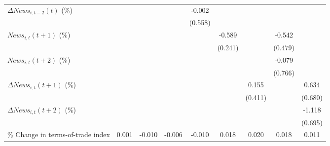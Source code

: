{\begin{tabular}{l*{8}{c}}
\addlinespace
$ \Delta News_{i,t-2}(t)$ (\%)&                     &                     &                     &      -0.002         &                     &                     &                     &                     \\
                    &                     &                     &                     &     (0.558)         &                     &                     &                     &                     \\
\addlinespace
$ News_{i,t}(t+1)$ (\%)&                     &                     &                     &                     &      -0.589\sym{**} &                     &      -0.542         &                     \\
                    &                     &                     &                     &                     &     (0.241)         &                     &     (0.479)         &                     \\
\addlinespace
$ News_{i,t}(t+2)$ (\%)&                     &                     &                     &                     &                     &                     &      -0.079         &                     \\
                    &                     &                     &                     &                     &                     &                     &     (0.766)         &                     \\
\addlinespace
$ \Delta News_{i,t}(t+1)$ (\%)&                     &                     &                     &                     &                     &       0.155         &                     &       0.634         \\
                    &                     &                     &                     &                     &                     &     (0.411)         &                     &     (0.680)         \\
\addlinespace
$ \Delta News_{i,t}(t+2)$ (\%)&                     &                     &                     &                     &                     &                     &                     &      -1.118         \\
                    &                     &                     &                     &                     &                     &                     &                     &     (0.695)         \\
\addlinespace
\% Change in terms-of-trade index&       0.001         &      -0.010         &      -0.006         &      -0.010         &       0.018         &       0.020         &       0.018         &       0.011         \\

\end{tabular}}
